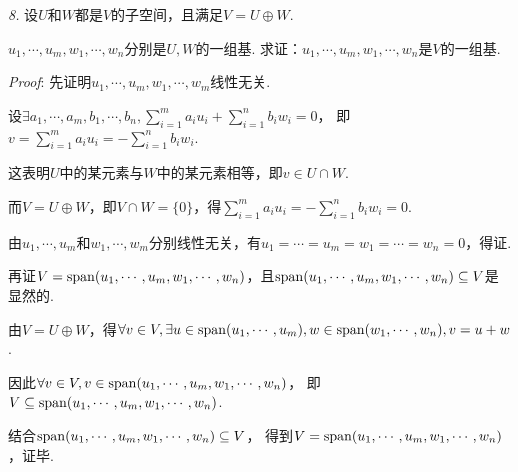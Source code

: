 \textit{8.}
设\(U\)和\(W\)都是\(V\)的子空间，且满足\(V=U \oplus W\).

\(u_1,\cdots,u_m,w_1,\cdots,w_n\)分别是\(U,W\)的一组基.
求证：\(u_1,\cdots,u_m,w_1,\cdots,w_n\)是\(V\)的一组基.

\textit{Proof}:
先证明\(u_1,\cdots,u_m,w_1,\cdots,w_m\)线性无关.

设\(\exists a_1,\cdots,a_m,b_1,\cdots,b_n,\sum_{i=1}^m a_iu_i+\sum_{i=1}^n b_iw_i=0\)，
即\(v=\sum_{i=1}^m a_iu_i=-\sum_{i=1}^n b_iw_i\).

这表明\(U\)中的某元素与\(W\)中的某元素相等，即\(v\in U\cap W\).

而\(V=U\oplus W\)，即\(V\cap W=\{0\}\)，得\(\sum_{i=1}^m a_iu_i=-\sum_{i=1}^n b_iw_i=0\).

由\(u_1,\cdots,u_m\)和\(w_1,\cdots,w_m\)分别线性无关，有\(u_1=\cdots=u_m=w_1=\cdots=w_n=0\)，得证.

再证\(V=\mathrm{span}(u_1,\cdots,u_m,w_1,\cdots,w_n)\)，且\(\mathrm{span}(u_1,\cdots,u_m,w_1,\cdots,w_n) \subseteq V\)是显然的.

由\(V=U\oplus W\)，得\(\forall v\in V,\exists u \in \mathrm{span}(u_1,\cdots,u_m),w \in \mathrm{span}(w_1,\cdots,w_n),v=u+w\).

因此\(\forall v \in V,v \in \mathrm{span} (u_1,\cdots,u_m,w_1,\cdots,w_n)\)，
即\(V \subseteq \mathrm{span}(u_1,\cdots,u_m,w_1,\cdots,w_n)\).

结合\(\mathrm{span}(u_1,\cdots,u_m,w_1,\cdots,w_n) \subseteq V\)，
得到\(V=\mathrm{span} (u_1,\cdots,u_m,w_1,\cdots,w_n)\)，证毕.


